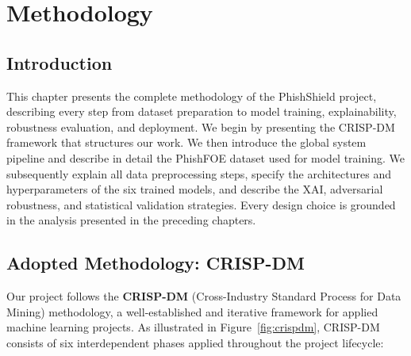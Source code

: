 \chapter{Methodology}
\vspace{0.5cm}
\minitoc
\vspace{1cm}

\section*{Introduction}

This chapter presents the complete methodology of the PhishShield project, describing every step from dataset preparation to model training, explainability, robustness evaluation, and deployment. We begin by presenting the CRISP-DM framework that structures our work. We then introduce the global system pipeline and describe in detail the PhishFOE dataset used for model training. We subsequently explain all data preprocessing steps, specify the architectures and hyperparameters of the six trained models, and describe the XAI, adversarial robustness, and statistical validation strategies. Every design choice is grounded in the analysis presented in the preceding chapters.

\section{Adopted Methodology: CRISP-DM}

Our project follows the \textbf{CRISP-DM} (Cross-Industry Standard Process for Data Mining) methodology, a well-established and iterative framework for applied machine learning projects. As illustrated in Figure~\ref{fig:crispdm}, CRISP-DM consists of six interdependent phases applied throughout the project lifecycle:

